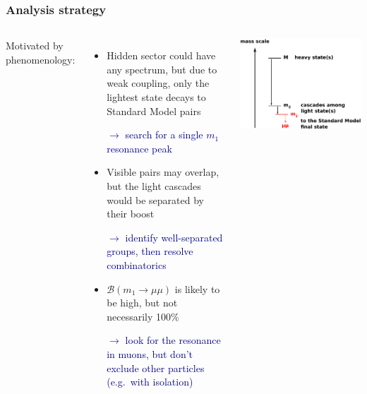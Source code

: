 \documentclass[compress]{beamer}
\begin{document}
\begin{frame}
\frametitle{Analysis strategy}
\begin{columns}
Motivated by phenomenology:
\begin{itemize}
\item Hidden sector could have any spectrum, but due to weak coupling,
  only the lightest state decays to Standard Model pairs

\textcolor{darkblue}{$\longrightarrow$ search for a single $m_1$ resonance peak}

\item Visible pairs may overlap, but the light cascades would be
  separated by their boost

\textcolor{darkblue}{$\longrightarrow$ identify well-separated groups, then
  resolve combinatorics}

\item $\mathcal{B}(m_1 \to \mu\mu)$ is likely to be high, but not
  necessarily 100\%

\textcolor{darkblue}{$\longrightarrow$ look for the resonance in
  muons, but don't exclude other particles (e.g.\ with isolation)}
\end{itemize}

\includegraphics[width=\linewidth]{basic_picture4.pdf}


\end{columns}
\end{frame}
\end{document}
